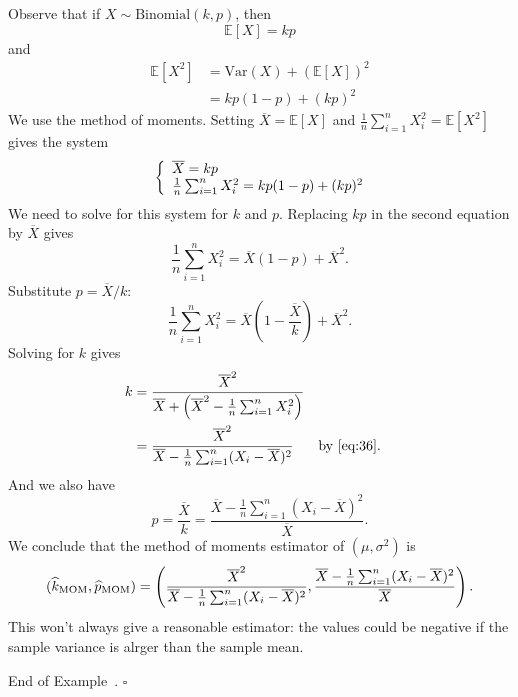\documentclass[10pt]{article}
\theoremstyle{definition}
\newtheorem{example}[theorem]{Example}
\renewenvironment{example}
{\begin{oldexample}}
  {\par\smallskip\hfill   End of Example~\theexample. $\square$    \par\end{oldexample}}
\newcommand{\1}[1]{\textbf{1}_{\left[#1\right]}} %
\def\E{\mathbb{E}} %
\def\Var{\mathrm{Var}} %
\begin{document}
\begin{example}[Crimes]
  Observe that if $X\sim \text{Binomial}(k,p)$, then
  \begin{equation*}
    \E\left[X \right] = kp 
  \end{equation*}
  and
  \begin{align*}
    \E\left[X^{2} \right] 
    &= \Var(X) + \left( \E\left[X \right] \right)^{2}\\
    &= kp(1-p) + (kp)^{2}
  \end{align*}
  We use the method of moments. Setting $\overline{X} = \E\left[X \right]$ and
  $\frac{1}{n}\sum_{i=1}^{n} X_{i}^{2} = \E\left[X^{2} \right]$ gives the
  system
  \begin{equation*}
    \left\{ \begin{array}{l@{}l} \overline{X}=kp \\ \frac{1}{n}\sum_{i=1}^{n} X_{i}^{2}=kp(1-p)+(kp)^{2} \end{array}\right.
  \end{equation*}
  We need to solve for this system for $k$ and $p$. Replacing $kp$ in the
  second equation by $\overline{X}$ gives
  \begin{equation*}
    \frac{1}{n}\sum_{i=1}^{n} X_{i}^{2} = \overline{X}(1-p)+ \overline{X}^{2}.
  \end{equation*}
  Substitute $p = \overline{X}/k$:
  \begin{equation*}
    \frac{1}{n}\sum_{i=1}^{n} X_{i}^{2} = \overline{X}\left( 1- \frac{\overline{X}}{k} \right) + \overline{X}^{2}.
  \end{equation*}
  Solving for $k$ gives
  \begin{align*}
    k 
    &= \frac{\overline{X}^{2}}{\overline{X}+ \left(\overline{X}^{2}- \frac{1}{n}\sum_{i=1}^{n} X_{i}^{2}\right)}\\
    &= \frac{\overline{X}^{2}}{\overline{X}- \frac{1}{n} \sum_{i=1}^{n}
      (X_{i}-\overline{X})^{2}} &&\text{by \cref{eq:36}.}\\
  \end{align*}
  And we also have
  \begin{equation*}
    p = \frac{\overline{X}}{k} = \frac{\overline{X}- \frac{1}{n}\sum_{i=1}^{n} (X_{i}-\overline{X})^{2}}{\overline{X}}.
  \end{equation*}
  We conclude that the method of moments estimator of $(\mu,\sigma^{2})$ is
  \begin{equation*}
    (\widehat{k}_{\rm MOM}, \widehat{p}_{\rm MOM}) = \left( \frac{\overline{X}^{2}}{\overline{X}- \frac{1}{n} \sum_{i=1}^{n}
        (X_{i}-\overline{X})^{2}},  \frac{\overline{X}- \frac{1}{n}\sum_{i=1}^{n} (X_{i}-\overline{X})^{2}}{\overline{X}} \right).
  \end{equation*}
  This won't always give a reasonable estimator: the values could be negative
  if the sample variance is alrger than the sample mean.


\end{example}
\end{document}
